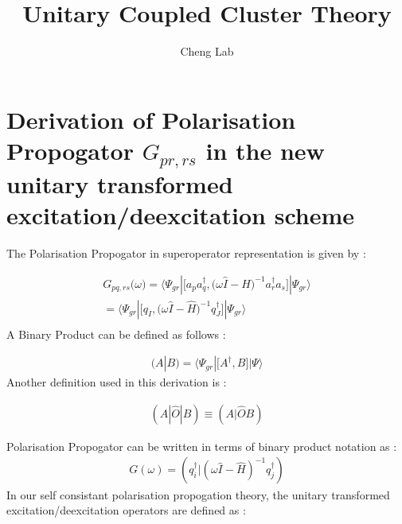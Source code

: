 \documentclass[11pt, oneside]{article}   	%
\title{Unitary Coupled Cluster Theory }
\author{Cheng Lab}
\begin{document}
\maketitle

\section{Derivation of Polarisation Propogator $G_{pr,rs}$ in  the new unitary transformed excitation/deexcitation scheme}
The Polarisation Propogator in superoperator representation is given by :

\begin{equation*}\label{eq:propogator}
  \begin{aligned}
    G_{pq,rs}\big(\omega\big)=\big \langle \Psi_{gr} |\big[ a_p a_q^\dagger , \big(\omega \hat I-\hat H \big)^{-1} a_r^\dagger a_s \big] | \Psi_{gr}\big \rangle \\
    =\big \langle \Psi_{gr} |\big[ q_I , \big(\omega \hat I-\hat H \big)^{-1} q_J^\dagger \big] | \Psi_{gr}\big \rangle \\ 
  \end{aligned}
\end{equation*}
A Binary Product can be defined as follows :

\begin{equation*}\label{eq:binary product}
  \begin{aligned}
    (A|B)=\big \langle \Psi_{gr}|\big[A^\dagger,B]|\Psi\rangle
  \end{aligned}
\end{equation*}
Another definition used in this derivation is :

\begin{equation*}\label{eq:superoperator}
  \begin{aligned}
    (A|\hat O |B)\equiv (A|\hat O B)
  \end{aligned}
\end{equation*}

Polarisation Propogator can be written in terms of binary product notation as :
\begin{equation*}\label{eq:superoperator}
  \begin{aligned}
    G(\omega)=(q_i^\dagger|(\omega \hat I - \hat H)^{-1}q_j^\dagger )
  \end{aligned}
\end{equation*}
In our self consistant polarisation propogation theory, the unitary transformed excitation/deexcitation operators are defined as :
\end{document}
